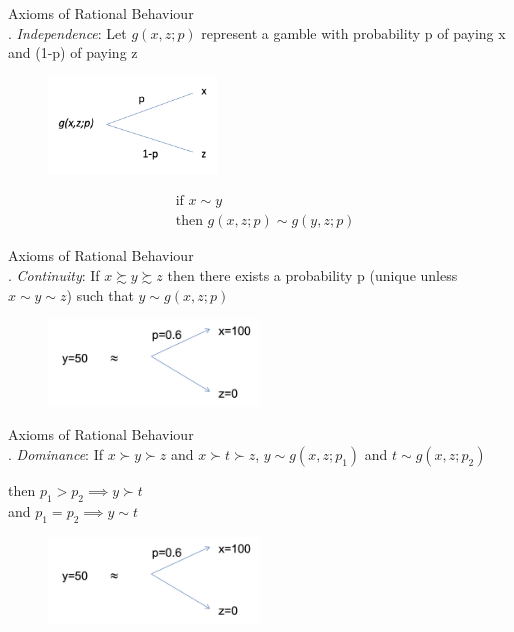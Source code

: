 \documentclass[
14pt,notheorems,hyperref={pdfauthor=whatever}
]{beamer}
\begin{document}
\begin{frame}
Axioms of Rational Behaviour\\
\hfill {}. \textit{Independence}: Let $g(x,z;p)$ represent a gamble with probability p of paying x and (1-p) of paying z\\
\begin{figure}[ut3]
    \includegraphics[width=0.4\textwidth]{L1UT3}
    \centering
\end{figure}
\begin{align*}
    &\textrm{if } x \sim y\\
    &\textrm{then } g(x,z;p) \sim g(y,z;p)
\end{align*}
\end{frame}

\begin{frame}
Axioms of Rational Behaviour\\
\hfill {}. \textit{Continuity}: If $x \succsim y \succsim z$ then there exists a probability p (unique unless $x \sim y \sim z$) such that $y \sim g(x,z;p)$\\
\begin{figure}[ut4]
    \includegraphics[width=0.5\textwidth]{L1UT4}
    \centering
\end{figure}
\end{frame}

\begin{frame}
Axioms of Rational Behaviour\\
\hfill {}. \textit{Dominance}: If $x \succ y \succ z$ and $x \succ t \succ z$, $y \sim g(x,z;p_1)$ and $t \sim g(x,z;p_2)$\\
\begin{center}
    then $p_1 > p_2 \implies y \succ t$\\
    and $p_1 = p_2 \implies y \sim t$\\
\end{center}
\begin{figure}[ut4]
    \includegraphics[width=0.5\textwidth]{L1UT4}
    \centering
\end{figure}
\end{frame}
\end{document}
